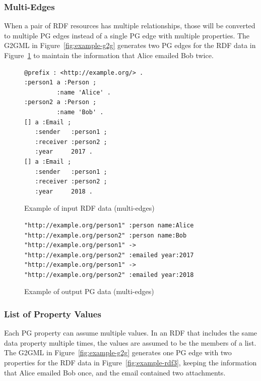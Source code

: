 \documentclass[runningheads]{llncs}
\begin{document}
\subsubsection{Multi-Edges}
When a pair of RDF resources has multiple relationships, those will be converted to multiple PG edges instead of a single PG edge with multiple properties. The G2GML in Figure~\ref{fig:example-g2g} generates two PG edges for the RDF data in Figure~\ref{fig:example-rdf2} to maintain the information that Alice emailed Bob twice.

\begin{figure}[!t]
\begin{scriptsize}
\begin{verbatim}
@prefix : <http://example.org/> .
:person1 a :Person ;
         :name 'Alice' .
:person2 a :Person ;
         :name 'Bob' .
[] a :Email ;
   :sender   :person1 ;
   :receiver :person2 ;
   :year     2017 .
[] a :Email ;
   :sender   :person1 ;
   :receiver :person2 ;
   :year     2018 .
\end{verbatim}
\end{scriptsize}
\caption{Example of input RDF data (multi-edges)}
\label{fig:example-rdf2}
\end{figure}


\begin{figure}[!t]
\begin{scriptsize}
\begin{verbatim}
"http://example.org/person1" :person name:Alice
"http://example.org/person2" :person name:Bob
"http://example.org/person1" -> "http://example.org/person2" :emailed year:2017
"http://example.org/person1" -> "http://example.org/person2" :emailed year:2018
\end{verbatim}
\end{scriptsize}
\caption{Example of output PG data (multi-edges)}
\label{fig:example-pg2}
\end{figure}

\subsubsection{List of Property Values}
Each PG property can assume multiple values. In an RDF that includes the same data property multiple times, the values are assumed to be the members of a list. The G2GML in Figure~\ref{fig:example-g2g} generates one PG edge with two properties for the RDF data in Figure~\ref{fig:example-rdf3}, keeping the information that Alice emailed Bob once, and the email contained two attachments.
\end{document}
